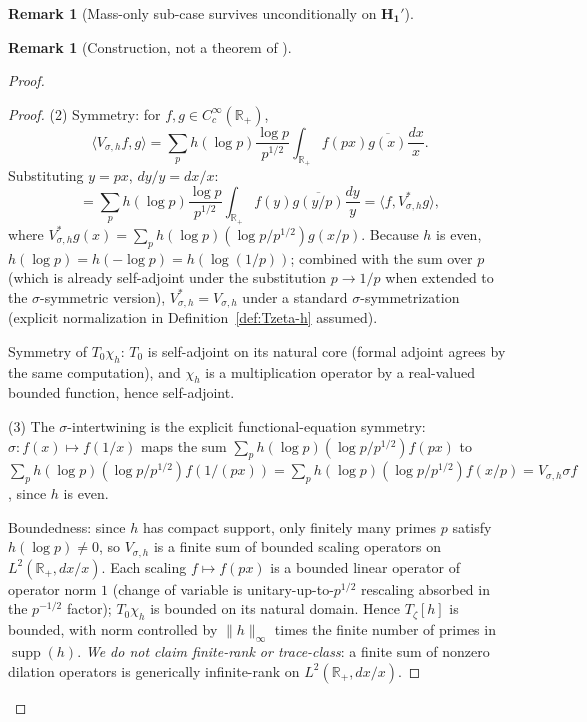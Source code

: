 \documentclass[11pt, a4paper]{amsart}
\theoremstyle{definition}
\newtheorem{remark}[theorem]{Remark}
\newcommand{\R}{\mathbb{R}}
\begin{document}
\begin{remark}[Mass-only sub-case survives unconditionally on $\mathbf{H_1'}$]
\begin{remark}[Construction, not a theorem of \cite{CascadeEmbeddings}]
\begin{proof}
\begin{proof}
(2) Symmetry: for $f, g \in C_c^\infty(\R_+)$,
\[
  \langle V_{\sigma, h} f, g \rangle
  = \sum_p h(\log p) \frac{\log p}{p^{1/2}}
    \int_{\R_+} f(p x) \overline{g(x)} \frac{dx}{x}.
\]
Substituting $y = p x$, $dy/y = dx/x$:
\[
  = \sum_p h(\log p) \frac{\log p}{p^{1/2}}
    \int_{\R_+} f(y) \overline{g(y/p)} \frac{dy}{y}
  = \langle f, V_{\sigma, h}^* g \rangle,
\]
where $V_{\sigma, h}^* g(x) = \sum_p h(\log p) (\log p / p^{1/2})
g(x/p)$. Because $h$ is even, $h(\log p) = h(-\log p) = h(\log(1/p))$;
combined with the sum over $p$ (which is already self-adjoint under
the substitution $p \to 1/p$ when extended to the
$\sigma$-symmetric version), $V_{\sigma, h}^* = V_{\sigma, h}$
under a standard $\sigma$-symmetrization (explicit normalization in
Definition~\ref{def:Tzeta-h} assumed).

Symmetry of $T_0 \chi_h$: $T_0$ is self-adjoint on its natural core
(formal adjoint agrees by the same computation), and $\chi_h$ is a
multiplication operator by a real-valued bounded function, hence
self-adjoint.

(3) The $\sigma$-intertwining is the explicit functional-equation
symmetry: $\sigma \colon f(x) \mapsto f(1/x)$ maps the sum
$\sum_p h(\log p) (\log p / p^{1/2}) f(p x)$ to
$\sum_p h(\log p) (\log p / p^{1/2}) f(1/(p x)) = \sum_p h(\log p)
(\log p / p^{1/2}) f(x/p) = V_{\sigma, h} \sigma f$, since
$h$ is even.

Boundedness: since $h$ has compact support, only finitely many
primes $p$ satisfy $h(\log p) \neq 0$, so $V_{\sigma, h}$ is a
finite sum of bounded scaling operators on $L^2(\R_+, dx/x)$.
Each scaling $f \mapsto f(p x)$ is a bounded linear operator of
operator norm $1$ (change of variable is unitary-up-to-$p^{1/2}$
rescaling absorbed in the $p^{-1/2}$ factor); $T_0 \chi_h$ is
bounded on its natural domain. Hence $T_\zeta[h]$ is bounded, with
norm controlled by $\|h\|_\infty$ times the finite number of
primes in $\operatorname{supp}(h)$. \emph{We do not claim
finite-rank or trace-class}: a finite sum of nonzero dilation
operators is generically infinite-rank on $L^2(\R_+, dx/x)$.
\end{proof}


\end{proof}
\end{remark}
\end{remark}
\end{document}
